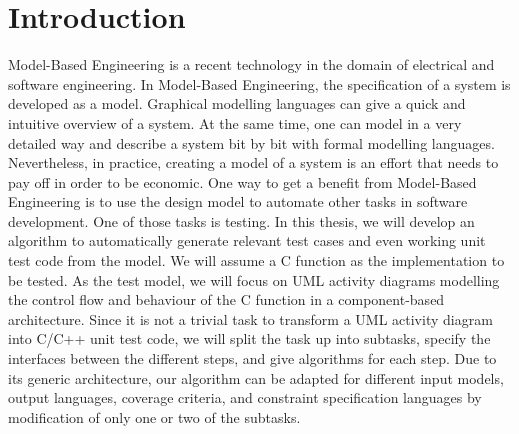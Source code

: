 \chapter{Introduction}
Model-Based Engineering is a recent technology in the domain of electrical and software engineering. In Model-Based Engineering, the specification of a system is developed as a model.
Graphical modelling languages can give a quick and intuitive overview of a system. At the same time, one can model in a very detailed way and describe a system bit by bit with formal modelling languages.
Nevertheless, in practice, creating a model of a system is an effort that needs to pay off in order to be economic.
One way to get a benefit from Model-Based Engineering is to use the design model to automate other tasks in software development. One of those tasks is testing. 
In this thesis, we will develop an algorithm to automatically generate relevant test cases and even working unit test code from the model. We will assume a C function as the implementation to be tested. As the test model, we will focus on UML activity diagrams modelling the control flow and behaviour of the C function in a component-based architecture. Since it is not a trivial task to transform a UML activity diagram into C/C++ unit test code, we will split the task up into subtasks, specify the interfaces between the different steps, and give algorithms for each step. Due to its generic architecture, our algorithm can be adapted for different input models, output languages, coverage criteria, and constraint specification languages by modification of only one or two of the subtasks.
